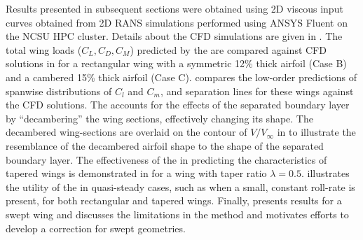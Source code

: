 Results presented in subsequent sections were obtained using 2D viscous input curves obtained from 2D RANS simulations performed using ANSYS Fluent on the NCSU HPC cluster. Details about the CFD simulations are given in . %
%
The total wing loads ($C_L, C_D, C_M$) predicted by the \methodabbr are compared against CFD solutions in  for a rectangular wing with a symmetric 12\% thick airfoil (Case B) and a cambered 15\% thick airfoil (Case C).
 compares the low-order predictions of spanwise distributions of $C_l$ and $C_m$, and separation lines for these wings against the CFD solutions.
The \methodname accounts for the effects of the separated boundary layer by ``decambering'' the wing sections, effectively changing its shape.
The decambered wing-sections are overlaid on the contour of $V/V_\infty$ in  to illustrate the resemblance of the decambered airfoil shape to the shape of the separated boundary layer.
The effectiveness of the \methodname in predicting the characteristics of tapered wings is demonstrated in  for a wing with taper ratio $\lambda = 0.5$.  illustrates the utility of the \methodname in quasi-steady cases, such as when a small, constant roll-rate is present, for both rectangular and tapered wings.
Finally,  presents results for a swept wing and discusses the limitations in the method and motivates efforts to develop a correction for swept geometries.






